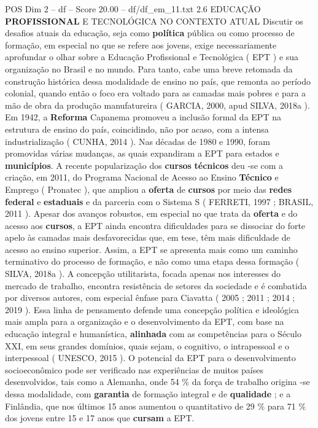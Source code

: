 \begin{textsample}{POS Dim 2 – df – Score 20.00 – df/df\_em\_11.txt}  \label{ex:f2_pos_125}
2.6 EDUCAÇÃO \textbf{PROFISSIONAL} E TECNOLÓGICA NO CONTEXTO ATUAL Discutir os desafios atuais da educação, seja como \textbf{política} pública ou como processo de formação, em especial no que se refere aos jovens, exige necessariamente aprofundar o olhar sobre a Educação Profissional e Tecnológica ( EPT ) e sua organização no Brasil e no mundo.
Para tanto, cabe uma breve retomada da construção histórica dessa modalidade de ensino no país, que remonta ao período colonial, quando então o foco era voltado para as camadas mais pobres e para a mão de obra da produção manufatureira ( GARCIA, 2000, apud SILVA, 2018a ).
Em 1942, a \textbf{Reforma} Capanema promoveu a inclusão formal da EPT na estrutura de ensino do país, coincidindo, não por acaso, com a intensa industrialização ( CUNHA, 2014 ).
Nas décadas de 1980 e 1990, foram promovidas várias mudanças, as quais expandiram a EPT para estados e \textbf{municípios}.
A recente popularização dos \textbf{cursos} \textbf{técnicos} deu -se com a criação, em 2011, do Programa Nacional de Acesso ao Ensino \textbf{Técnico} e Emprego ( Pronatec ), que ampliou a \textbf{oferta} de \textbf{cursos} por meio das \textbf{redes} \textbf{federal} e \textbf{estaduais} e da parceria com o Sistema S ( FERRETI, 1997 ; BRASIL, 2011 ).
Apesar dos avanços robustos, em especial no que trata da \textbf{oferta} e do acesso aos \textbf{cursos}, a EPT ainda encontra dificuldades para se dissociar do forte apelo às camadas mais desfavorecidas que, em tese, têm mais dificuldade de acesso ao ensino superior.
Assim, a EPT se apresenta mais como um caminho terminativo do processo de formação, e não como uma etapa dessa formação ( SILVA, 2018a ).
A concepção utilitarista, focada apenas nos interesses do mercado de trabalho, encontra resistência de setores da sociedade e é combatida por diversos autores, com especial ênfase para Ciavatta ( 2005 ; 2011 ; 2014 ; 2019 ).
Essa linha de pensamento defende uma concepção política e ideológica mais ampla para a organização e o desenvolvimento da EPT, com base na educação integral e humanística, \textbf{alinhada} com as competências para o Século XXI, em seus grandes domínios, quais sejam, o cognitivo, o intrapessoal e o interpessoal ( UNESCO, 2015 ).
O potencial da EPT para o desenvolvimento socioeconômico pode ser verificado nas experiências de muitos países desenvolvidos, tais como a Alemanha, onde 54 \% da força de trabalho origina -se dessa modalidade, com \textbf{garantia} de formação integral e de \textbf{qualidade} ; e a Finlândia, que nos últimos 15 anos aumentou o quantitativo de 29 \% para 71 \% dos jovens entre 15 e 17 anos que \textbf{cursam} a EPT.

\end{textsample}
